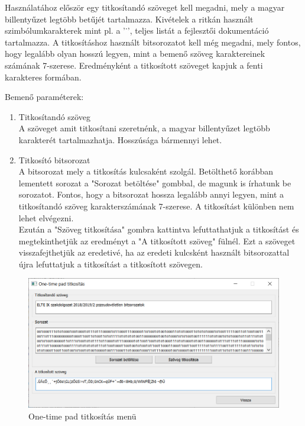 \documentclass[hidelinks, 12pt]{article}
\begin{document}
	Használatához először egy titkosítandó szöveget kell megadni, mely a magyar billentyűzet legtöbb betűjét tartalmazza. Kivételek a ritkán használt szimbólumkarakterek mint pl. a '˙', teljes listát a fejlesztői dokumentáció tartalmazza. A titkosításhoz használt bitsorozatot kell még megadni, mely fontos, hogy legalább olyan hosszú legyen, mint a bemenő szöveg karaktereinek számának 7-szerese. Eredményként a titkosított szöveget kapjuk a fenti karakteres formában.
	
	Bemenő paraméterek:
	\begin{enumerate}
		\bfseries \item Titkosítandó szöveg \\
		\normalfont A szöveget amit titkosítani szeretnénk, a magyar billentyűzet legtöbb karakterét tartalmazhatja. Hosszúsága bármennyi lehet.
		\bfseries \item Titkosító bitsorozat \\
		\normalfont A bitsorozat mely a titkosítás kulcsaként szolgál. Betölthető korábban lementett sorozat a "Sorozat betöltése" gombbal, de magunk is írhatunk be sorozatot. Fontos, hogy a bitsorozat hossza legalább annyi legyen, mint a titkosítandó szöveg karakterszámának 7-szerese. A titkosítást különben nem lehet elvégezni. \\
		Ezután a "Szöveg titkosítása" gombra kattintva lefuttathatjuk a titkosítást és megtekinthetjük az eredményt a "A titkosított szöveg" fülnél. Ezt a szöveget visszafejthetjük az eredetivé, ha az eredeti kulcsként használt bitsorozattal újra lefuttatjuk a titkosítást a titkosított szövegen.
	\end{enumerate}
	\begin{figure}[h]
		\centering
		\begin{minipage}{\textwidth} %
			\includegraphics[width=\textwidth]{onetimepadmenu.png}
		\end{minipage}
		\caption{One-time pad titkosítás menü}
	\end{figure}
	\newpage
\end{document}
